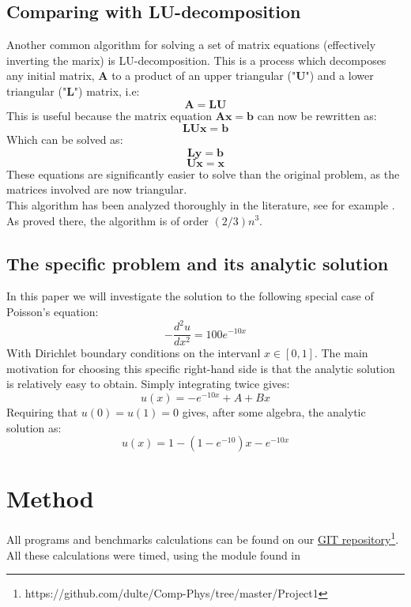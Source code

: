 \documentclass[a4paper, 10pt]{article}
\begin{document}
\subsection{Comparing with LU-decomposition}
Another common algorithm for solving a set of matrix equations (effectively inverting the marix) is LU-decomposition. This is a process which decomposes any initial matrix, $\mathbf{A}$ to a product of an upper triangular ("$\mathbf{U}$") and a lower triangular ("$\mathbf{L}$") matrix, i.e:
\begin{equation}
\mathbf{A}=\mathbf{L}\mathbf{U}
\end{equation}
This is useful because the matrix equation $\mathbf{A}\mathbf{x}=\mathbf{b}$ can now be rewritten as:
$$\mathbf{L}\mathbf{U}\mathbf{x}=\mathbf{b}$$
Which can be solved as:\\
\begin{equation}\label{eq:LU_1}
\mathbf{L}\mathbf{y}=\mathbf{b}
\end{equation}
\begin{equation}\label{eq:LU_2}
\mathbf{Ux}=\mathbf{x}
\end{equation} These equations are significantly easier to solve than the original problem, as the matrices involved are now triangular.\\
\linebreak This algorithm has been analyzed thoroughly in the literature, see for example \cite{LU-decomp}. As proved there, the algorithm is of order $(2/3)n^3$. 
\subsection{The specific problem and its analytic solution} \label{analytic_solution}
In this paper we will investigate the solution to the following special case of Poisson's equation:
\begin{equation}\label{eq:poisson_rhs}
-\frac{d^2 u}{dx^2}=100e^{-10x}
\end{equation}
With Dirichlet boundary conditions on the intervanl $x\in [0, 1]$. The main motivation for choosing this specific right-hand side is that the analytic solution is relatively easy to obtain. Simply integrating twice gives:
$$u(x)=-e^{-10x}+A+Bx$$
Requiring that $u(0)=u(1)=0$ gives, after some algebra, the analytic solution as:
\begin{equation}\label{eq:analytic_solution}
u(x)=1-(1-e^{-10})x-e^{-10x}
\end{equation}
\section{Method}\label{Method}
All programs and benchmarks calculations can be found on our \href{https://github.com/dulte/Comp-Phys/tree/master/Project1}{GIT repository}\footnote{https://github.com/dulte/Comp-Phys/tree/master/Project1}. All these calculations were timed, using the module found in \cite{Morten}
\end{document}
